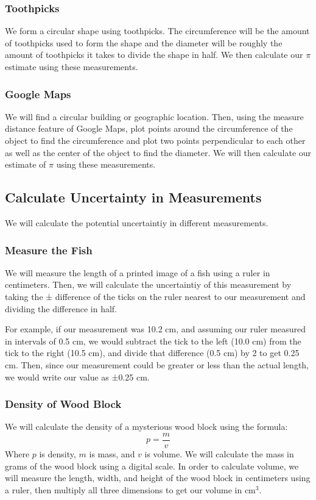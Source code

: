 \documentclass{article}
\begin{document}
\subsubsection{Toothpicks}
We form a circular shape using toothpicks. The circumference will be the amount 
of toothpicks used to form the shape and the diameter will be roughly the amount 
of toothpicks it takes to divide the shape in half. We then calculate our $\pi$ 
estimate using these measurements.

\subsubsection{Google Maps}
We will find a circular building or geographic location. Then, using the measure
distance feature of Google Maps, plot points around the circumference of the object to 
find the circumference and plot two points perpendicular to each other as well as the center of 
the object to find the diameter. We will then calculate our estimate of $\pi$ using these 
measurements.

\subsection{Calculate Uncertainty in Measurements}
We will calculate the potential uncertaintiy in different measurements.

\subsubsection{Measure the Fish}
We will measure the length of a printed image of a fish using a ruler in centimeters. Then, we will calculate
the uncertaintiy of this measurement by taking the ± difference of the ticks on the ruler nearest to our
measurement and dividing the difference in half.

For example, if our measurement was 10.2 cm, and assuming our ruler measured in intervals of 0.5 cm, we
would subtract the tick to the left (10.0 cm) from the tick to the right (10.5 cm), and divide that difference
(0.5 cm) by 2 to get 0.25 cm. Then, since our measurement could be greater or less than the actual length,
we would write our value as ±0.25 cm.

\subsubsection{Density of Wood Block}
We will calculate the density of a mysterious wood block using the formula:
\[ p = \frac{m}{v}\]
Where $p$ is density, $m$ is mass, and $v$ is volume. 
We will calculate the mass in grams of the wood block using a digital scale. 
In order to calculate volume, we will measure the length, width, and height of 
the wood block in centimeters using a ruler, then multiply all three dimensions to 
get our volume in $\mathrm{cm}^3$.
\end{document}
